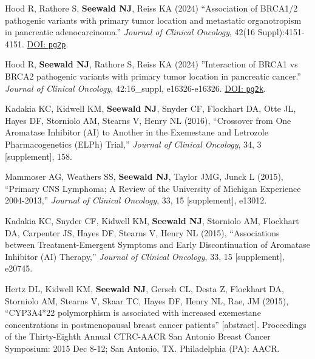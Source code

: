 \documentclass[letterpaper,11pt]{article} %
\begin{document}
\begin{etaremune}
            \item Hood R, Rathore S, \textbf{Seewald NJ}, Reiss KA (2024) ``Association of BRCA1/2 pathogenic variants with primary tumor location and metastatic organotropism in pancreatic adenocarcinoma.'' \textit{Journal of Clinical Oncology}, 42(16 Suppl):4151-4151. \href{https://doi.org/pg2p}{DOI: \texttt{pg2p}}.

            \item Hood R, \textbf{Seewald NJ}, Rathore S, Reiss KA (2024) ''Interaction of BRCA1 vs BRCA2 pathogenic variants with primary tumor location in pancreatic cancer.'' \textit{Journal of Clinical Oncology}, 42:16\_suppl, e16326-e16326. \href{https://doi.org/pg2k}{DOI: \texttt{pg2k}}.
        
            \item Kadakia KC, Kidwell KM, \textbf{Seewald NJ}, Snyder CF, Flockhart DA, Otte JL, Hayes DF, Storniolo AM, Stearns V, Henry NL (2016), ``Crossover from One Aromatase Inhibitor (AI) to Another in the Exemestane and Letrozole Pharmacogenetics (ELPh) Trial,'' \textit{Journal of Clinical Oncology}, 34, 3 [supplement], 158.
    			
            \item Mammoser AG, Weathers SS, \textbf{Seewald NJ}, Taylor JMG, Junck L (2015), ``Primary CNS Lymphoma; A Review of the University of Michigan Experience 2004-2013,'' \textit{Journal of Clinical Oncology}, 33, 15 [supplement], e13012.
    			
            \item Kadakia KC, Snyder CF, Kidwell KM, \textbf{Seewald NJ}, Storniolo AM, Flockhart DA, Carpenter JS, Hayes DF, Stearns V, Henry NL (2015), ``Associations between Treatment-Emergent Symptoms and Early Discontinuation of Aromatase Inhibitor (AI) Therapy,'' \textit{Journal of Clinical Oncology}, 33, 15 [supplement], e20745.
     		
            \item Hertz DL, Kidwell KM, \textbf{Seewald NJ}, Gersch CL, Desta Z, Flockhart DA, Storniolo AM, Stearns V, Skaar TC, Hayes DF, Henry NL, Rae, JM (2015), ``CYP3A4*22 polymorphism is associated with increased exemestane concentrations in postmenopausal breast cancer patients'' [abstract]. Proceedings of the Thirty-Eighth Annual CTRC-AACR San Antonio Breast Cancer Symposium: 2015 Dec 8-12; San Antonio, TX. Philadelphia (PA): AACR.
 	\end{etaremune}
\end{document}
